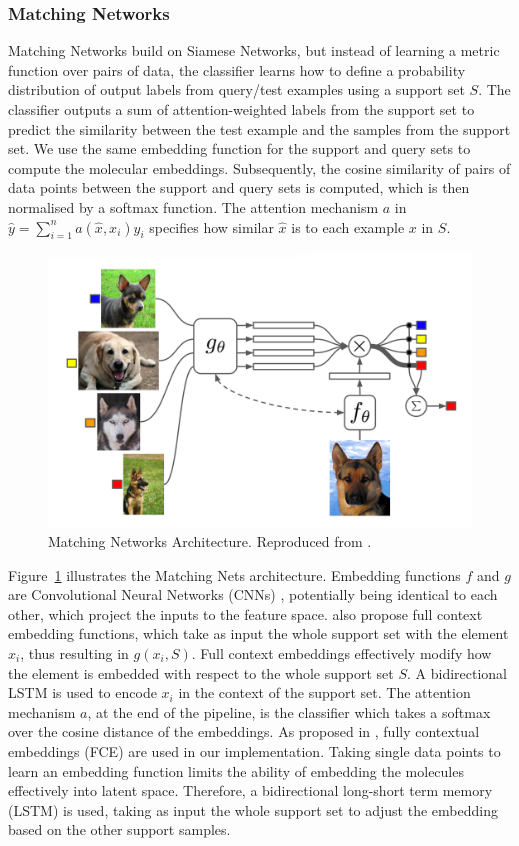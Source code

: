 \subsubsection{Matching Networks}

Matching Networks build on Siamese Networks, but instead of learning a metric function over pairs of data, the classifier learns how to define a probability distribution of output labels from query/test examples using a support set $S$. The classifier outputs a sum of attention-weighted labels from the support set to predict the similarity between the test example and the samples from the support set. We use the same embedding function for the support and query sets to compute the molecular embeddings. Subsequently, the cosine similarity of pairs of data points between the support and query sets is computed, which is then normalised by a softmax function. The attention mechanism $a$ in $\hat{y} = \sum_{i=1}^{n} a(\hat{x}, x_i)y_i$ specifies how similar $\hat{x}$ is to each example $x$ in $S$.

\begin{figure}[!ht]
	\centering
	\includegraphics[width=0.7\linewidth]{img/matching_networks.png}
	\caption[Matching Networks Architecture]{Matching Networks Architecture. Reproduced from \citet{vinyals2016matching}.}
	\label{fig:matchingnets}
\end{figure}

Figure~\ref{fig:matchingnets} illustrates the Matching Nets architecture. Embedding functions $f$ and $g$ are Convolutional Neural Networks (CNNs) \citep{lecun1995convolutional}, potentially being identical to each other, which project the inputs to the feature space. \citet{vinyals2016matching} also propose full context embedding functions, which take as input the whole support set with the element $x_i$, thus resulting in \( g(x_i, S) \). Full context embeddings effectively modify how the element is embedded with respect to the whole support set $S$. A bidirectional LSTM is used to encode $x_i$ in the context of the support set. The attention mechanism $a$, at the end of the pipeline, is the classifier which takes a softmax over the cosine distance of the embeddings. As proposed in \citet{vinyals2016matching}, fully contextual embeddings (FCE) are used in our implementation. Taking single data points to learn an embedding function limits the ability of embedding the molecules effectively into latent space. Therefore, a bidirectional long-short term memory (LSTM) is used, taking as input the whole support set to adjust the embedding based on the other support samples.

